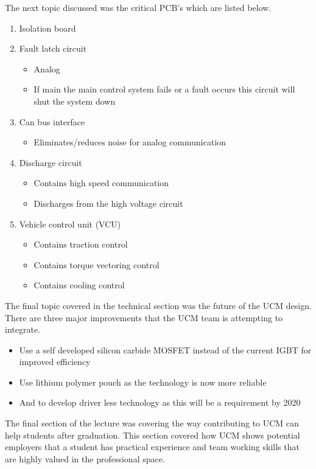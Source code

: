 \documentclass{article}
\begin{document}
The next topic discussed was the critical PCB's which are listed below.

\begin{enumerate}
    \item{Isolation board}
    \item{Fault latch circuit}
    \begin{itemize}
        \item{Analog}
        \item{If main the main control system fails or a fault occurs this circuit will shut the system down}
    \end{itemize}
    \item{Can bus interface}
    \begin{itemize}
        \item{Eliminates/reduces noise for analog communication}
    \end{itemize}
    \item{Discharge circuit}
    \begin{itemize}
        \item{Contains high speed communication}
        \item{Discharges from the high voltage circuit}
    \end{itemize}
    \item{Vehicle control unit (VCU)}
    \begin{itemize}
        \item{Contains traction control}
        \item{Contains torque vectoring control}
        \item{Contains cooling control}
    \end{itemize}
\end{enumerate}

The final topic covered in the technical section was the future of the UCM design. There are three
major improvements that the UCM team is attempting to integrate.

\begin{itemize}
    \item{Use a self developed silicon carbide MOSFET instead of the current IGBT for improved
        efficiency}
    \item{Use lithium polymer pouch as the technology is now more reliable}
    \item{And to develop driver less technology as this will be a requirement by 2020}
\end{itemize}

The final section of the lecture was covering the way contributing to UCM can help students after
graduation. This section covered how UCM shows potential employers that a student has practical
experience and team working skills that are highly valued in the professional space. 
\end{document}
